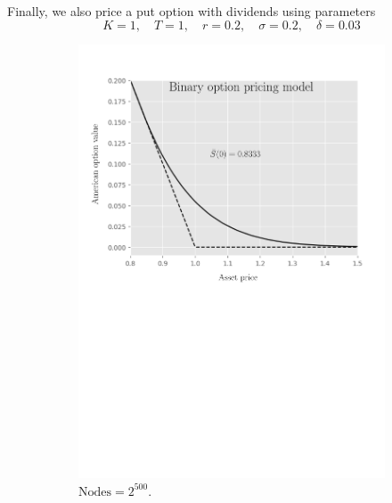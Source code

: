Finally, we also price a put option with dividends using parameters
\begin{equation}
  \label{eq:numericaresults:parameters_set_4}
  K = 1, \quad T = 1, \quad r=0.2, \quad \sigma=0.2, \quad \delta = 0.03
\end{equation}
\begin{figure}[H]
  \centering
  \begin{subfigure}{0.4\textwidth}
    \centering
    \includegraphics[width=\textwidth]{chapters/chapter3/TestCase4BOPM.pdf}
    \caption{$\text{Nodes} = 2^{500}$.}
    \label{fig:finitedifferencesschemes:numericaresults:test_case_4_bopm}
  \end{subfigure}
  \hspace{0.5cm}
  \begin{subfigure}{0.4\textwidth}
    \centering

\end{subfigure}
\end{figure}
